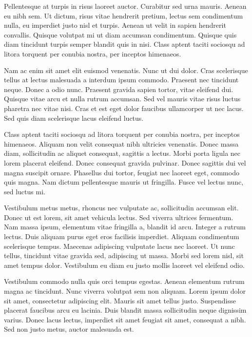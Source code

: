 Pellentesque at turpis in risus laoreet auctor. Curabitur sed urna
mauris. Aenean eu nibh sem. Ut dictum, risus vitae hendrerit pretium,
lectus sem condimentum nulla, eu imperdiet justo nisl et turpis. Aenean
ut velit in sapien hendrerit convallis. Quisque volutpat mi ut diam
accumsan condimentum. Quisque quis diam tincidunt turpis semper blandit
quis in nisi. Class aptent taciti sociosqu ad litora torquent per
conubia nostra, per inceptos himenaeos.

Nam ac enim sit amet elit euismod venenatis. Nunc ut dui dolor. Cras
scelerisque tellus at lectus malesuada a interdum ipsum commodo. Praesent
nec tincidunt neque. Donec a odio nunc. Praesent gravida sapien tortor,
vitae eleifend dui. Quisque vitae arcu et nulla rutrum accumsan. Sed
vel mauris vitae risus luctus pharetra nec vitae nisi. Cras et est
eget dolor faucibus ullamcorper ut nec lacus. Sed quis diam scelerisque
lacus eleifend luctus.

Class aptent taciti sociosqu ad litora torquent per conubia nostra,
per inceptos himenaeos. Aliquam non velit consequat nibh ultricies
venenatis. Donec massa diam, sollicitudin ac aliquet consequat, sagittis
a lectus. Morbi porta ligula nec lorem placerat eleifend. Donec consequat
gravida pulvinar. Donec sagittis dui vel magna suscipit ornare. Phasellus
dui tortor, feugiat nec laoreet eget, commodo quis magna. Nam dictum
pellentesque mauris ut fringilla. Fusce vel lectus nunc, sed luctus
mi.

Vestibulum metus metus, rhoncus nec vulputate ac, sollicitudin accumsan
elit. Donec ut est lorem, sit amet vehicula lectus. Sed viverra ultrices
fermentum. Nam massa ipsum, elementum vitae fringilla a, blandit id
arcu. Integer a rutrum lectus. Duis aliquam purus eget eros facilisis
imperdiet. Aliquam condimentum scelerisque tempus. Maecenas adipiscing
vulputate lacus nec laoreet. Ut nunc tellus, tincidunt vitae gravida
sed, adipiscing ut massa. Morbi sed lorem nisl, sit amet tempus dolor.
Vestibulum eu diam eu justo mollis laoreet vel eleifend odio.

Vestibulum commodo nulla quis orci tempus egestas. Aenean elementum
rutrum magna ac tincidunt. Nunc viverra volutpat sem non aliquam.
Lorem ipsum dolor sit amet, consectetur adipiscing elit. Mauris sit
amet tellus justo. Suspendisse placerat faucibus arcu eu lacinia.
Duis blandit massa sollicitudin neque dignissim varius. Donec lacus
lectus, imperdiet sit amet feugiat sit amet, consequat a nibh. Sed
non justo metus, auctor malesuada est.


